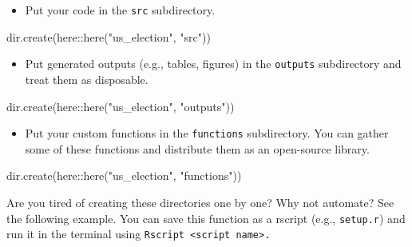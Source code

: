 \documentclass[
]{book}
\newenvironment{Shaded}{\begin{snugshade}}{\end{snugshade}}
\newcommand{\FunctionTok}[1]{\textcolor[rgb]{0.00,0.00,0.00}{#1}}
\newcommand{\NormalTok}[1]{#1}
\newcommand{\SpecialCharTok}[1]{\textcolor[rgb]{0.00,0.00,0.00}{#1}}
\newcommand{\StringTok}[1]{\textcolor[rgb]{0.31,0.60,0.02}{#1}}
\providecommand{\tightlist}{%
  \setlength{\itemsep}{0pt}\setlength{\parskip}{0pt}}
\begin{document}
\begin{itemize}
\tightlist
\item
  Put your code in the \texttt{src} subdirectory.
\end{itemize}

\begin{Shaded}
\begin{Highlighting}[]
\FunctionTok{dir.create}\NormalTok{(here}\SpecialCharTok{::}\FunctionTok{here}\NormalTok{(}\StringTok{"us\_election"}\NormalTok{, }\StringTok{"src"}\NormalTok{))}
\end{Highlighting}
\end{Shaded}

\begin{itemize}
\tightlist
\item
  Put generated outputs (e.g., tables, figures) in the \texttt{outputs} subdirectory and treat them as disposable.
\end{itemize}

\begin{Shaded}
\begin{Highlighting}[]
\FunctionTok{dir.create}\NormalTok{(here}\SpecialCharTok{::}\FunctionTok{here}\NormalTok{(}\StringTok{"us\_election"}\NormalTok{, }\StringTok{"outputs"}\NormalTok{))}
\end{Highlighting}
\end{Shaded}

\begin{itemize}
\tightlist
\item
  Put your custom functions in the \texttt{functions} subdirectory. You can gather some of these functions and distribute them as an open-source library.
\end{itemize}

\begin{Shaded}
\begin{Highlighting}[]
\FunctionTok{dir.create}\NormalTok{(here}\SpecialCharTok{::}\FunctionTok{here}\NormalTok{(}\StringTok{"us\_election"}\NormalTok{, }\StringTok{"functions"}\NormalTok{))}
\end{Highlighting}
\end{Shaded}

Are you tired of creating these directories one by one? Why not automate? See the following example. You can save this function as a rscript (e.g., \texttt{setup.r}) and run it in the terminal using \texttt{Rscript\ \textless{}script\ name\textgreater{}.}
\end{document}
